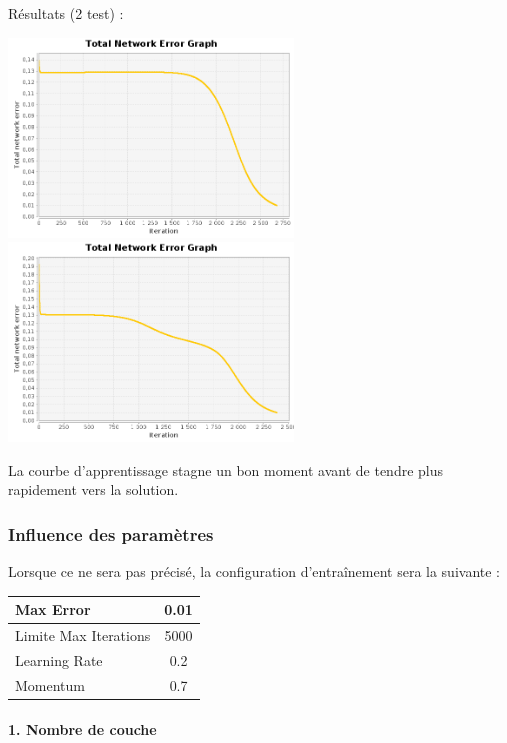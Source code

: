 \documentclass[10pt]{report}
\begin{document}
Résultats (2 test) :\\
\begin{center}
\includegraphics[height=200px]{img/EQ_EG_2.png}\\
\includegraphics[height=200px]{img/EQ_EG_3.png}\\
\end{center}

La courbe d'apprentissage stagne un bon moment avant de tendre plus rapidement vers la solution.

\subsubsection{Influence des paramètres}

Lorsque ce ne sera pas précisé, la configuration d'entraînement sera la suivante :\\
\begin{tabular}{|l|c|}
	\hline
	Max Error & 0.01 \\
	\hline
	Limite Max Iterations & 5000 \\
	\hline
	Learning Rate & 0.2 \\
	\hline
	Momentum & 0.7 \\
	\hline
\end{tabular}

\paragraph{1. Nombre de couche}
\end{document}
